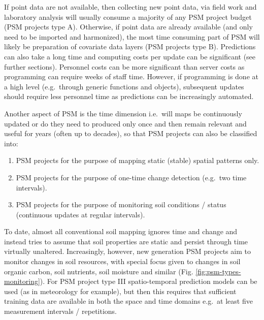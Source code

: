 \documentclass[graybox,natbib,nospthms,UStrade]{svmono}
\begin{document}
If point data are not available, then collecting new point data, via
field work and laboratory analysis will usually consume a majority of
any PSM project budget (PSM projects type A). Otherwise, if point data
are already available (and only need to be imported and harmonized), the
most time consuming part of PSM will likely be preparation of covariate
data layers (PSM projects type B). Predictions can also take a long time
and computing costs per update can be significant (see further sections).
Personnel costs can be more significant than server costs as programming
can require weeks of staff time. However, if programming is done at a
high level (e.g.~through generic functions and objects), subsequent
updates should require less personnel time as predictions can be
increasingly automated.

Another aspect of PSM is the time dimension i.e.~will maps be
continuously updated or do they need to produced only once and then
remain relevant and useful for years (often up to decades), so that PSM
projects can also be classified into:

\begin{enumerate}
\def\labelenumi{\Roman{enumi}.}
\item
  PSM projects for the purpose of mapping static (stable) spatial
  patterns only.
\item
  PSM projects for the purpose of one-time change detection (e.g.~two
  time intervals).
\item
  PSM projects for the purpose of monitoring soil conditions / status
  (continuous updates at regular intervals).
\end{enumerate}

To date, almost all conventional soil mapping ignores time and change
and instead tries to assume that soil properties are static and persist
through time virtually unaltered. Increasingly, however, new generation
PSM projects aim to monitor changes in soil resources, with special
focus given to changes in soil organic carbon, soil nutrients, soil moisture and
similar (Fig. \ref{fig:psm-types-monitoring}). For PSM project
type III spatio-temporal prediction models can
be used (as in meteorology for example), but then this requires that
sufficient training data are available in both the space and time domains e.g.~at least
five measurement intervals / repetitions.
\end{document}
